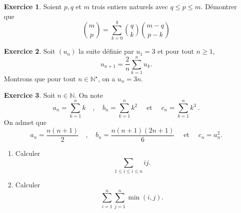 \documentclass[a4paper, 11pt,openany]{article}%
\theoremstyle{plain}
\theoremstyle{definition}
\newtheorem{exo}{Exercice}
\newtheorem{sol}{Solution de l'exercice}
\theoremstyle{remark}
\newcommand{\C}{\mathbb{C}}
\newcommand{\N}{\mathbb{N}}
\newcommand{\calP}{\mathcal{P}}
\begin{document}
\begin{exo}
	Soient $p,q$ et $m$ trois entiers naturels avec $q\leqslant p \leqslant m$. Démontrer que 
	\[
		\binom{m}{p}  = \sum_{k=0}^q \binom{q}{k}\binom{m-q}{p-k}
	\]
\end{exo}




\begin{exo}
Soit $(u_n)$ la suite définie par $u_1 = 3$ et pour tout $n \geqslant 1$,
\[ u_{n+1} = \frac{2}{n} \sum_{k=1}^n u_k.\]
Montrons que pour tout $n \in \N^{\star}$, on a $u_n = 3n$.
\end{exo}


\begin{exo}
	Soit $n\in \N$. On note  
	\[
		a_n = \sum_{k=1}^n k
		\quad , \quad 
		b_n = \sum_{k=1}^n k^2
		\quad \mbox{ et }\quad 
		c_n = \sum_{k=1}^n k^3 \ .
	\]
	On admet que
		\[
		a_n = \frac{n(n+1)}{2}
		\quad , \quad 
		b_n = \frac{n(n+1)(2n+1)}{6}
		\quad \mbox{ et }\quad 
		c_n = a_n^2 .
	\]
	\begin{enumerate}
		\item Calculer $$\sum_{1\leqslant i \leqslant i \leqslant n} ij.$$		
		\item Calculer $$ \sum_{i=1}^n \sum_{j=1}^n \min(i,j).$$
	\end{enumerate}
\end{exo}
\end{document}
